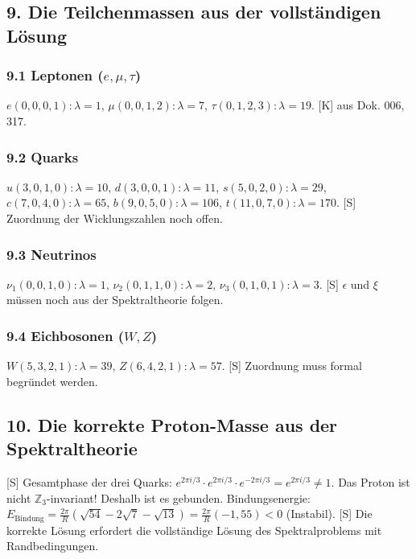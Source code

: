 \documentclass[11pt,a4paper]{article}
\begin{document}
	\subsection{9. Die Teilchenmassen aus der vollständigen Lösung}
	\subsubsection{9.1 Leptonen ($e, \mu, \tau$)}
	$e(0,0,0,1): \lambda = 1$, $\mu(0,0,1,2): \lambda = 7$, $\tau(0,1,2,3): \lambda = 19$. [K] aus Dok. 006, 317.
	
	\subsubsection{9.2 Quarks}
	$u(3,0,1,0): \lambda = 10$, $d(3,0,0,1): \lambda = 11$, $s(5,0,2,0): \lambda = 29$, $c(7,0,4,0): \lambda = 65$, $b(9,0,5,0): \lambda = 106$, $t(11,0,7,0): \lambda = 170$. [S] Zuordnung der Wicklungszahlen noch offen.
	
	\subsubsection{9.3 Neutrinos}
	$\nu_1(0,0,1,0): \lambda = 1$, $\nu_2(0,1,1,0): \lambda = 2$, $\nu_3(0,1,0,1): \lambda = 3$. [S] $\epsilon$ und $\xi$ müssen noch aus der Spektraltheorie folgen.
	
	\subsubsection{9.4 Eichbosonen ($W, Z$)}
	$W(5,3,2,1): \lambda = 39$, $Z(6,4,2,1): \lambda = 57$. [S] Zuordnung muss formal begründet werden.
	
	\subsection{10. Die korrekte Proton-Masse aus der Spektraltheorie}
	[S] Gesamtphase der drei Quarks: $e^{2\pi i/3} \cdot e^{2\pi i/3} \cdot e^{-2\pi i/3} = e^{2\pi i/3} \neq 1$.
	Das Proton ist nicht $\mathbb{Z}_3$-invariant! Deshalb ist es gebunden.
	Bindungsenergie: $E_{\text{Bindung}} = \frac{2\pi}{R} (\sqrt{54} - 2\sqrt{7} - \sqrt{13}) = \frac{2\pi}{R} (-1{,}55) < 0$ (Instabil).
	[S] Die korrekte Lösung erfordert die vollständige Lösung des Spektralproblems mit Randbedingungen.
	
\end{document}

